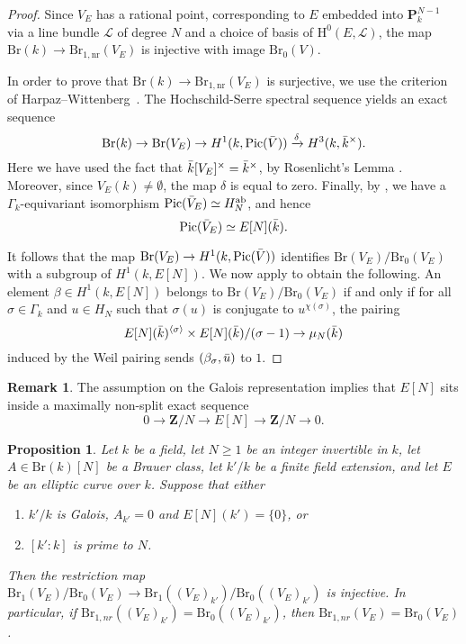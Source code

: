 \documentclass[10pt,letterpaper,twoside]{article}
\newcommand{\Lscr}{\mathcal{L}}
\renewcommand{\H}{\mathrm{H}}
\renewcommand{\1}{\mathbf{1}}
\newcommand{\bP}{\mathbf{P}}
\newcommand{\bZ}{\mathbf{Z}}
\newcommand{\nr}{\mathrm{nr}}
\renewcommand{\geq}{\geqslant}
\newcommand{\Pic}{\mathrm{Pic}}
\newcommand{\Br}{\mathrm{Br}}
\theoremstyle{plain}
\newtheorem{proposition}[theorem]{Proposition}
\theoremstyle{plain}
\theoremstyle{definition}
\theoremstyle{named}
\theoremstyle{definition}
\newtheorem{remark}[theorem]{Remark}
\begin{document}
	\begin{proof}
	Since $V_E$ has a rational point, corresponding to $E$ embedded into $\bP^{N-1}_k$ via a line bundle $\Lscr$ of degree $N$ and a choice of basis of $\H^0(E,\Lscr)$, the map
		$\Br(k)\rightarrow\Br_{1,\nr}(V_E)$ is injective with image $\Br_0(V)$. 
		
		In order to prove that $\Br(k)\rightarrow\Br_{1,\nr}(V_E)$ is surjective, we use the criterion of
		Harpaz--Wittenberg~\cite{harpaz-wittenberg-massey}. The Hochschild-Serre spectral sequence yields an exact sequence
		\[\Br(k)\to \Br(V_E)\to H^1(k,\Pic(\Bar{V}))\xrightarrow{\delta}H^3(k,\Bar{k}^\times).\]
		Here we have used the fact that $\Bar{k}[V_E]^\times=\Bar{k}^\times$, by Rosenlicht's Lemma \cite{}. Moreover, since $V_E(k)\neq \emptyset$, the map $\delta$ is equal to zero. Finally, by \cite{}, we have a $\Gamma_k$-equivariant isomorphism $\Pic(\Bar{V}_E)\simeq H^{\mathrm{ab}}_N$, and hence
		\[\Pic(\Bar{V}_E)\simeq E[N](\Bar{k}).\]
		
		It follows that the map $\Br(V_E)\to H^1(k,\Pic(\Bar{V}))$ identifies $\Br(V_E)/\Br_0(V_E)$ with a subgroup of $H^1(k,E[N])$. We now apply \cite[Proposition 3.3]{harpaz-wittenberg-massey} to obtain the following. An element $\beta\in H^1(k,E[N])$ belongs to $\Br(V_E)/\Br_0(V_E)$ if and only if for all $\sigma\in \Gamma_k$ and $u\in H_N$ such that $\sigma(u)$ is conjugate to $u^{\chi(\sigma)}$, the pairing
		\[E[N](\Bar{k})^{\langle\sigma\rangle}\times E[N](\Bar{k})/(\sigma-1)\to \mu_N(\Bar{k})\]
		induced by the Weil pairing sends $(\beta_{\sigma},\Bar{u})$ to $1$. 
	\end{proof}
	
	\begin{remark}
		The assumption on the Galois representation implies that $E[N]$ sits inside a maximally non-split exact sequence
		$$0\rightarrow\bZ/N\rightarrow E[N]\rightarrow\bZ/N\rightarrow 0.$$
	\end{remark}
	
	
	
	\begin{proposition}\label{restrict}
	Let $k$ be a field, let $N\geq 1$ be an integer invertible in $k$, let $A\in \Br(k)[N]$ be a Brauer class, let $k'/k$ be a finite field extension, and let $E$ be an elliptic curve over $k$. Suppose that either
	\begin{enumerate}
		\item $k'/k$ is Galois, $A_{k'}=0$ and $E[N](k')=\{0\}$, or
		\item $[k':k]$ is prime to $N$.
	\end{enumerate}
	Then the restriction map $\Br_1(V_E)/\Br_0(V_E)\to \Br_1((V_E)_{k'})/\Br_0((V_E)_{k'})$ is injective. In particular, if $\Br_{1,nr}((V_E)_{k'})=\Br_0((V_E)_{k'})$, then $\Br_{1,nr}(V_E)=\Br_0(V_E)$.
	\end{proposition}
	
\end{document}
